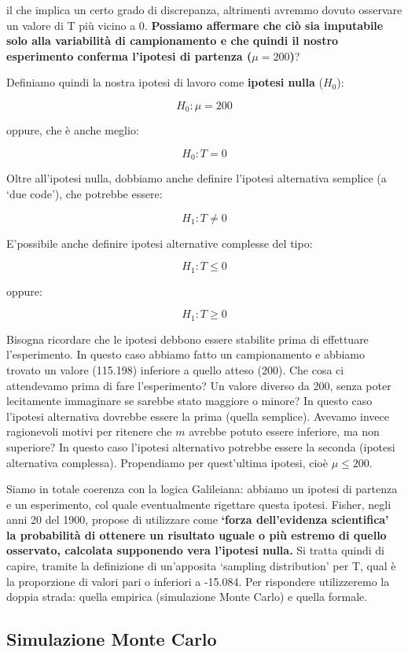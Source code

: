 \documentclass[a4paper,12pt,oneside]{book}
\theoremstyle{definition}
\theoremstyle{definition}
\theoremstyle{definition}
\theoremstyle{remark}
\begin{document}
il che implica un certo grado di discrepanza, altrimenti avremmo dovuto
osservare un valore di T più vicino a 0. \textbf{Possiamo affermare che
ciò sia imputabile solo alla variabilità di campionamento e che quindi
il nostro esperimento conferma l'ipotesi di partenza (\(\mu = 200\))}?

Definiamo quindi la nostra ipotesi di lavoro come \textbf{ipotesi nulla}
(\(H_0\)):

\[H_0: \mu = 200\]

oppure, che è anche meglio:

\[H_0: T = 0\]

Oltre all'ipotesi nulla, dobbiamo anche definire l'ipotesi alternativa
semplice (a `due code'), che potrebbe essere:

\[H_1: T \neq 0\]

E'possibile anche definire ipotesi alternative complesse del tipo:

\[H_1: T \leq 0\]

oppure:

\[H_1: T \geq 0\]

Bisogna ricordare che le ipotesi debbono essere stabilite prima di
effettuare l'esperimento. In questo caso abbiamo fatto un campionamento
e abbiamo trovato un valore (115.198) inferiore a quello atteso (200).
Che cosa ci attendevamo prima di fare l'esperimento? Un valore diverso
da 200, senza poter lecitamente immaginare se sarebbe stato maggiore o
minore? In questo caso l'ipotesi alternativa dovrebbe essere la prima
(quella semplice). Avevamo invece ragionevoli motivi per ritenere che
\(m\) avrebbe potuto essere inferiore, ma non superiore? In questo caso
l'ipotesi alternativo potrebbe essere la seconda (ipotesi alternativa
complessa). Propendiamo per quest'ultima ipotesi, cioè \(\mu \leq 200\).

Siamo in totale coerenza con la logica Galileiana: abbiamo un ipotesi di
partenza e un esperimento, col quale eventualmente rigettare questa
ipotesi. Fisher, negli anni 20 del 1900, propose di utilizzare come
\textbf{`forza dell'evidenza scientifica' la probabilità di ottenere un
risultato uguale o più estremo di quello osservato, calcolata supponendo
vera l'ipotesi nulla.} Si tratta quindi di capire, tramite la
definizione di un'apposita `sampling distribution' per T, qual è la
proporzione di valori pari o inferiori a -15.084. Per rispondere
utilizzeremo la doppia strada: quella empirica (simulazione Monte Carlo)
e quella formale.

\subsection{Simulazione Monte Carlo}\label{simulazione-monte-carlo}
\end{document}
